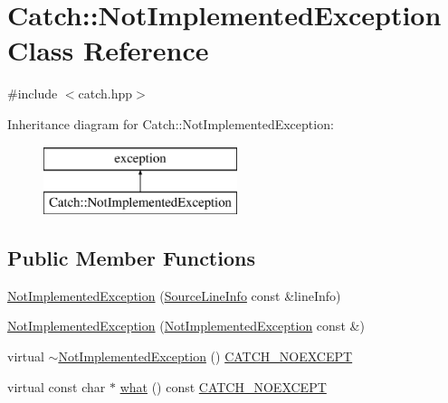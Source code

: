 \hypertarget{classCatch_1_1NotImplementedException}{\section{Catch\-:\-:Not\-Implemented\-Exception Class Reference}
\label{classCatch_1_1NotImplementedException}
}


{\ttfamily \#include $<$catch.\-hpp$>$}

Inheritance diagram for Catch\-:\-:Not\-Implemented\-Exception\-:\begin{figure}[H]
\begin{center}
\leavevmode
\includegraphics[height=2.000000cm]{classCatch_1_1NotImplementedException}
\end{center}
\end{figure}
\subsection*{Public Member Functions}
\begin{DoxyCompactItemize}
\item 
\hyperlink{classCatch_1_1NotImplementedException_ab4f0a5c39d8ffb72c664e2c07e180634}{Not\-Implemented\-Exception} (\hyperlink{structCatch_1_1SourceLineInfo}{Source\-Line\-Info} const \&line\-Info)
\item 
\hyperlink{classCatch_1_1NotImplementedException_a508a7a833455da2d3c10ea1a9d45e982}{Not\-Implemented\-Exception} (\hyperlink{classCatch_1_1NotImplementedException}{Not\-Implemented\-Exception} const \&)
\item 
virtual \hyperlink{classCatch_1_1NotImplementedException_a557e7312aaa32c37bded019f2b059bcb}{$\sim$\-Not\-Implemented\-Exception} () \hyperlink{catch_8hpp_a0408e94ca73880d41f38852b68eadb3c}{C\-A\-T\-C\-H\-\_\-\-N\-O\-E\-X\-C\-E\-P\-T}
\item 
virtual const char $\ast$ \hyperlink{classCatch_1_1NotImplementedException_ad4c13963f1a8feacda0cd331adda89e3}{what} () const \hyperlink{catch_8hpp_a0408e94ca73880d41f38852b68eadb3c}{C\-A\-T\-C\-H\-\_\-\-N\-O\-E\-X\-C\-E\-P\-T}
\end{DoxyCompactItemize}


